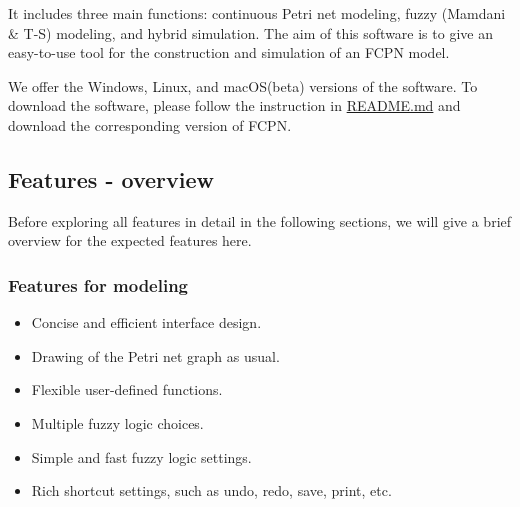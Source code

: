 \documentclass[journal,a4paper,onecolumn]{article}
\begin{document}
It includes three main functions: continuous Petri net modeling, fuzzy (Mamdani \& T-S) modeling, and hybrid simulation. %
The aim of this software is to give an easy-to-use tool for the construction and simulation of an FCPN model.



We offer the Windows, Linux, and macOS(beta) versions of the software. To download the software, please follow the instruction in \href{https://github.com/liufei2016/fcpn/blob/master/README.md}{README.md} and download the corresponding version of FCPN.

\subsection{Features - overview}
Before exploring all features in detail in the following sections, we will give a brief overview for the expected features here.

\subsubsection{Features for modeling}
\begin{itemize}
	\item Concise and efficient interface design.
	\item Drawing of the Petri net graph as usual.
	\item Flexible user-defined functions.
	\item Multiple fuzzy logic choices.
	\item Simple and fast fuzzy logic settings.
	\item Rich shortcut settings, such as undo, redo, save, print, etc.
\end{itemize}
\end{document}
